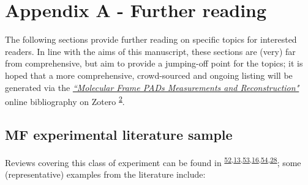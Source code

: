\documentclass[10pt]{article}
\begin{document}

\section{Appendix A - Further reading\label{sec:Appendix-A}}

The following sections provide further reading on specific topics for interested readers. In line with the aims of this manuscript, these sections are (very) far from comprehensive, but aim to provide a jumping-off point for the topics; it is hoped that a more comprehensive, crowd-sourced and ongoing listing will be generated via the \href{https://www.zotero.org/groups/4733878/molecular_frame_pads_measurements_and_reconstruction}{\textit{``Molecular Frame PADs Measurements and Reconstruction"}} online bibliography on Zotero \textsuperscript{\hyperref[csl:2]{2}}.

\subsection{MF experimental literature sample\label{appendix:MF-expt}}

Reviews covering this class of experiment can be found in  \textsuperscript{\hyperref[csl:52]{52},\hyperref[csl:13]{13},\hyperref[csl:53]{53},\hyperref[csl:16]{16},\hyperref[csl:54]{54},\hyperref[csl:28]{28}}; some (representative) examples from the literature include:
\end{document}
